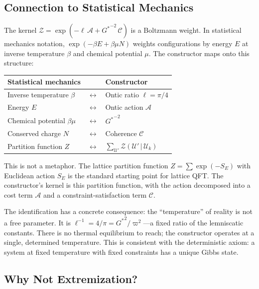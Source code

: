\documentclass[11pt,a4paper]{article}
\newcommand{\vpi}{\varpi}
\newcommand{\UU}{\mathcal{U}}
\newcommand{\onticell}{\ell}
\theoremstyle{compact}
\begin{document}
\subsection*{Connection to Statistical Mechanics}

The kernel $\mathcal{Z} = \exp(-\onticell\,\mathcal{A} + {G^*}^{-2}\,\mathcal{C})$ is a Boltzmann weight. In statistical mechanics notation, $\exp(-\beta E + \beta\mu N)$ weights configurations by energy $E$ at inverse temperature $\beta$ and chemical potential $\mu$. The constructor maps onto this structure:

\begin{center}
\begin{tabular}{lcl}
\toprule
\textbf{Statistical mechanics} & & \textbf{Constructor} \\
\midrule
Inverse temperature $\beta$ & $\longleftrightarrow$ & Ontic ratio $\onticell = \pi/4$ \\
Energy $E$ & $\longleftrightarrow$ & Ontic action $\mathcal{A}$ \\
Chemical potential $\beta\mu$ & $\longleftrightarrow$ & ${G^*}^{-2}$ \\
Conserved charge $N$ & $\longleftrightarrow$ & Coherence $\mathcal{C}$ \\
Partition function $Z$ & $\longleftrightarrow$ & $\sum_{\UU'} \mathcal{Z}(\UU'\,|\,\UU_k)$ \\
\bottomrule
\end{tabular}
\end{center}

This is not a metaphor. The lattice partition function $Z = \sum \exp(-S_E)$ with Euclidean action $S_E$ is the standard starting point for lattice QFT. The constructor's kernel is this partition function, with the action decomposed into a cost term $\mathcal{A}$ and a constraint-satisfaction term $\mathcal{C}$.

The identification has a concrete consequence: the ``temperature'' of reality is not a free parameter. It is $\onticell^{-1} = 4/\pi = {G^*}^2/\vpi^2$---a fixed ratio of the lemniscatic constants. There is no thermal equilibrium to reach; the constructor operates at a single, determined temperature. This is consistent with the deterministic axiom: a system at fixed temperature with fixed constraints has a unique Gibbs state.

\subsection*{Why Not Extremization?}
\end{document}
